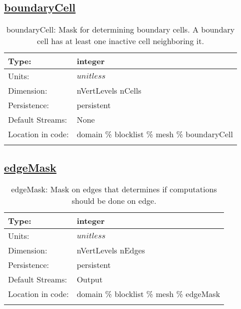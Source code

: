 \subsection[boundaryCell]{\hyperref[sec:var_tab_mesh]{boundaryCell}}
\label{subsec:var_sec_mesh_boundaryCell}
\begin{center}
\begin{longtable}{| p{2.0in} | p{4.0in} |}
        \hline 
        Type: & integer \\
        \hline 
        Units: & $unitless$ \\
        \hline 
        Dimension: & nVertLevels nCells \\
        \hline 
        Persistence: & persistent \\
        \hline 
		 Default Streams: & None \\
        \hline 
		 Location in code: & domain \% blocklist \% mesh \% boundaryCell \\
		 \hline 
    \caption{boundaryCell: Mask for determining boundary cells. A boundary cell has at least one inactive cell neighboring it.}
\end{longtable}
\end{center}
\subsection[edgeMask]{\hyperref[sec:var_tab_mesh]{edgeMask}}
\label{subsec:var_sec_mesh_edgeMask}
\begin{center}
\begin{longtable}{| p{2.0in} | p{4.0in} |}
        \hline 
        Type: & integer \\
        \hline 
        Units: & $unitless$ \\
        \hline 
        Dimension: & nVertLevels nEdges \\
        \hline 
        Persistence: & persistent \\
        \hline 
		 Default Streams: & Output  \\
        \hline 
		 Location in code: & domain \% blocklist \% mesh \% edgeMask \\
		 \hline 
    \caption{edgeMask: Mask on edges that determines if computations should be done on edge.}
\end{longtable}
\end{center}
